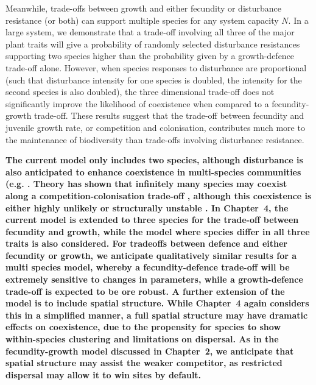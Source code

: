 Meanwhile, trade-offs between growth and either fecundity or disturbance resistance (or both) can support multiple species for any system capacity $N$. In a large system, we demonstrate that a trade-off involving all three of the major plant traits will give a probability of randomly selected disturbance resistances supporting two species higher than the probability given by a growth-defence trade-off alone. However, when species responses to disturbance are proportional (such that disturbance intensity for one species is doubled, the intensity for the second species is also doubled), the three dimensional trade-off does not significantly improve the likelihood of coexistence when compared to a fecundity-growth trade-off. These results suggest that the trade-off between fecundity and juvenile growth rate, or competition and colonisation, contributes much more to the maintenance of biodiversity than trade-offs involving disturbance resistance.  

\textbf{The current model only includes two species, although disturbance is also anticipated to enhance coexistence in multi-species communities (e.g. \cite{loehle2000strategy,roxburgh2004intermediate}. Theory has shown that infinitely many species may coexist along a competition-colonisation trade-off \cite{tilman1994competition,adler2000space}, although this coexistence is either highly unlikely or structurally unstable \cite{nattrass2012quantifying, gyllenberg2005impossibility}. In Chapter~4, the current model is extended to three species for the trade-off between fecundity and growth, while the model where species differ in all three traits is also considered. For tradeoffs between defence and either fecundity or growth, we anticipate qualitatively similar results for a multi species model, whereby a fecundity-defence trade-off will be extremely sensitive to changes in parameters, while a growth-defence trade-off is expected to be ore robust. A further extension of the model is to include spatial structure. While Chapter~4 again considers this in a simplified manner, a full spatial structure may have dramatic effects on coexistence, due to the propensity for species to show within-species clustering \cite{condit2000spatial,murrell2001uniting} and limitations on dispersal. As in the fecundity-growth model discussed in Chapter~2, we anticipate that spatial structure may assist the weaker competitor, as restricted dispersal may allow it to win sites by default.}

